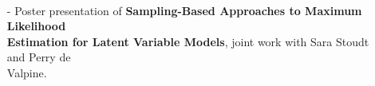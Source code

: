 \documentclass{res}
\begin{document}
\begin{resume}
  \\ 
    \begin{itemize}\setlength\itemsep{0em}
    \item[-] Poster presentation of \textbf{Sampling-Based Approaches to Maximum Likelihood \\Estimation for Latent Variable Models}, joint work with Sara Stoudt and Perry de \\Valpine.
    \end{itemize}
    
\end{resume}
\end{document}
